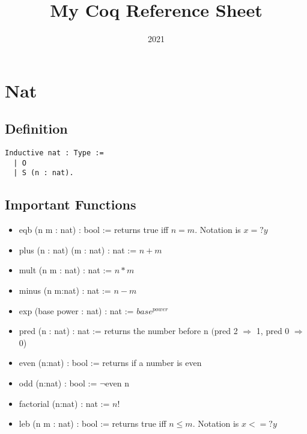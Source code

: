 \documentclass[12pt,a4paper]{article}
\author{}
\title{My Coq Reference Sheet}
\date{2021}
\theoremstyle{case}
\begin{document}
\maketitle



\section{Nat}
\subsection{Definition}
\begin{verbatim}
Inductive nat : Type :=
  | O
  | S (n : nat).
\end{verbatim}
\subsection{Important Functions}
\begin{itemize}
    \item eqb (n m : nat) : bool := returns true iff $n=m$. Notation is $x =? y$
    \item plus (n : nat) (m : nat) : nat := $n + m$
    \item mult (n m : nat) : nat := $n*m$
    \item minus (n m:nat) : nat := $n-m$
    \item exp (base power : nat) : nat := $base^{power}$
    \item pred (n : nat) : nat := returns the number before n $($pred 2 $\Rightarrow$ 1, pred 0 $\Rightarrow$ 0)
    \item even (n:nat) : bool := returns if a number is even
    \item odd (n:nat) : bool := $\neg $even n
    \item factorial (n:nat) : nat := $n!$
    \item leb (n m : nat) : bool := returns true iff $n\leq m$. Notation is $x <=? y$
\end{itemize}
\end{document}
